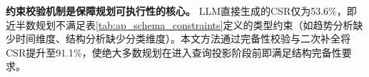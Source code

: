 \textbf{约束校验机制是保障规划可执行性的核心。} LLM直接生成的CSR仅为53.6\%，即近半数规划不满足表\ref{tab:ap_schema_constraints}定义的类型约束（如趋势分析缺少时间维度、结构分析缺少分类维度）。本文方法通过完备性校验与二次补全将CSR提升至91.1\%，使绝大多数规划在进入查询投影阶段前即满足结构完备性要求。









